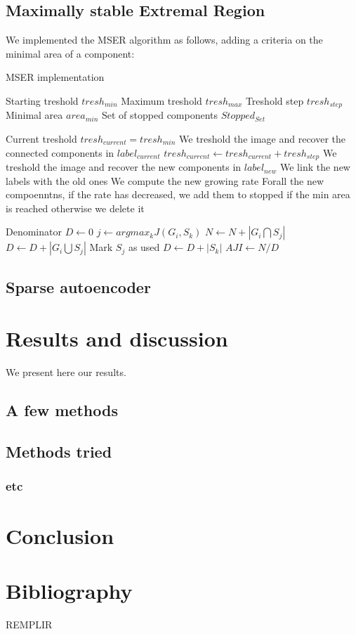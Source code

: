 \documentclass{report}
\begin{document}
\section{Maximally stable Extremal Region}

We implemented the MSER algorithm as follows, adding a criteria on the minimal area of a component:
\begin{algorithm}
\caption{MSER implementation}
\begin{algorithmic} 
\STATE Starting treshold $tresh_{min}$
\STATE Maximum treshold $tresh_{max}$
\STATE Treshold step $tresh_{step}$
\STATE Minimal area $area_{min}$ 
\STATE Set of stopped components $Stopped_{Set}$ \newline

\STATE Current treshold $tresh_{current} = tresh_{min}$
\STATE We treshold the image and recover the connected components in $label_{current}$
	\STATE $tresh_{current} \leftarrow tresh_{current} + tresh_{step}$
	\STATE We treshold the image and recover the new components in $label_{new}$
	\STATE We link the new labels with the old ones
	\STATE We compute the new growing rate
	\STATE Forall the new compoenntns, if the rate has decreased, we add them to stopped if the min area is reached otherwise we delete it
\ENDWHILE

\STATE Denominator $D \leftarrow 0$
\STATE $j \leftarrow argmax_k J(G_i, S_k)$
\STATE $N \leftarrow N+|G_i\bigcap S_j|$
\STATE $D \leftarrow D+|G_i\bigcup S_j|$
\STATE Mark $S_j$ as used
\ENDFOR
{}
\STATE $D \leftarrow D + |S_k|$
\ENDIF
\ENDFOR
\STATE $AJI \leftarrow N/D$
\end{algorithmic}
\end{algorithm}
  



\section{Sparse autoencoder}

\chapter{Results and discussion}
We present here our results.

\section{A few methods}
\section{Methods tried}
\subsection{etc}

\chapter{Conclusion}

\chapter{Bibliography}
REMPLIR



\end{document}
